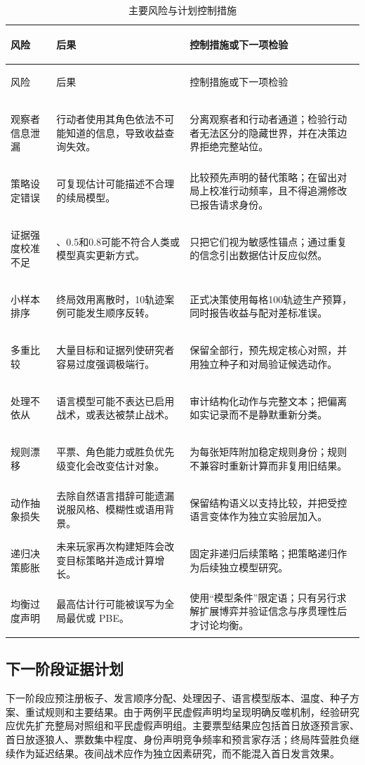 \documentclass[UTF8,11pt,a4paper,fontset=windows]{ctexart}
\begin{document}
\begin{longtable}{>{\bfseries\raggedright\arraybackslash}p{}>{\raggedright\arraybackslash}p{}>{\raggedright\arraybackslash}p{}}
\caption{主要风险与计划控制措施}\\
\toprule
风险 & 后果 & 控制措施或下一项检验 \\
\midrule
\endfirsthead
\toprule
风险 & 后果 & 控制措施或下一项检验 \\
\midrule
\endhead
观察者信息泄漏 & 行动者使用其角色依法不可能知道的信息，导致收益查询失效。 & 分离观察者和行动者通道；检验行动者无法区分的隐藏世界，并在决策边界拒绝完整站位。 \\
策略设定错误 & 可复现估计可能描述不合理的续局模型。 & 比较预先声明的替代策略；在留出对局上校准行动频率，且不得追溯修改已报告请求身份。 \\
证据强度校准不足 & 0、0.5和0.8可能不符合人类或模型真实更新方式。 & 只把它们视为敏感性锚点；通过重复的信念引出数据估计反应似然。 \\
小样本排序 & 终局效用离散时，10轨迹案例可能发生顺序反转。 & 正式决策使用每格100轨迹生产预算，同时报告收益与配对差标准误。 \\
多重比较 & 大量目标和证据列使研究者容易过度强调极端行。 & 保留全部行，预先规定核心对照，并用独立种子和对局验证候选动作。 \\
处理不依从 & 语言模型可能不表达已启用战术，或表达被禁止战术。 & 审计结构化动作与完整文本；把偏离如实记录而不是静默重新分类。 \\
规则漂移 & 平票、角色能力或胜负优先级变化会改变估计对象。 & 为每张矩阵附加稳定规则身份；规则不兼容时重新计算而非复用旧结果。 \\
动作抽象损失 & 去除自然语言措辞可能遗漏说服风格、模糊性或语用背景。 & 保留结构语义以支持比较，并把受控语言变体作为独立实验层加入。 \\
递归决策膨胀 & 未来玩家再次构建矩阵会改变目标策略并造成计算增长。 & 固定非递归后续策略；把策略递归作为后续独立模型研究。 \\
均衡过度声明 & 最高估计行可能被误写为全局最优或 PBE。 & 使用“模型条件”限定语；只有另行求解扩展博弈并验证信念与序贯理性后才讨论均衡。 \\
\bottomrule
\end{longtable}

\subsection{下一阶段证据计划}

下一阶段应预注册板子、发言顺序分配、处理因子、语言模型版本、温度、种子方案、重试规则和主要结果。由于两例平民虚假声明均呈现明确反噬机制，经验研究应优先扩充整局对照组和平民虚假声明组。主要票型结果应包括首日放逐预言家、首日放逐狼人、票数集中程度、身份声明竞争频率和预言家存活；终局阵营胜负继续作为延迟结果。夜间战术应作为独立因素研究，而不能混入首日发言效果。
\end{document}

